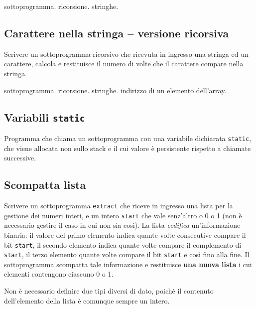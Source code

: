 \begin{tags}
sottoprogramma. ricorsione. stringhe.
\end{tags}


\subsection{Carattere nella stringa -- versione ricorsiva}
Scrivere un sottoprogramma ricorsivo che ricevuta in ingresso una stringa ed un carattere, calcola e restituisce il numero di volte che il carattere compare nella stringa.

\begin{tags}
sottoprogramma. ricorsione. stringhe. indirizzo di un elemento dell'array.
\end{tags}


\subsection{Variabili \texttt{static}}
Programma che chiama un sottoprogramma con una variabile dichiarata \texttt{static}, che viene allocata non sullo stack e il cui valore \`e persistente rispetto a chiamate successive.


\subsection{Scompatta lista}
Scrivere un sottoprogramma \texttt{extract} che riceve in ingresso una lista per la gestione dei numeri interi, e un intero \texttt{start} che vale senz'altro o 0 o 1 (non \`e necessario gestire il caso in cui non sia cos\`i). La lista \textit{codifica} un'informazione binaria: il valore del primo elemento indica quante volte consecutive compare il bit \texttt{start}, il secondo elemento indica quante volte compare il complemento di \texttt{start}, il terzo elemento quante volte compare il bit  \texttt{start} e cos\`i fino alla fine.
Il sottoprogramma scompatta tale informazione e restituisce \textbf{una nuova lista} i cui elementi contengono ciascuno 0 o 1. 

Non \`e necessario definire due tipi diversi di dato, poich\`e il contenuto dell'elemento della lista \`e comunque sempre un intero. 

